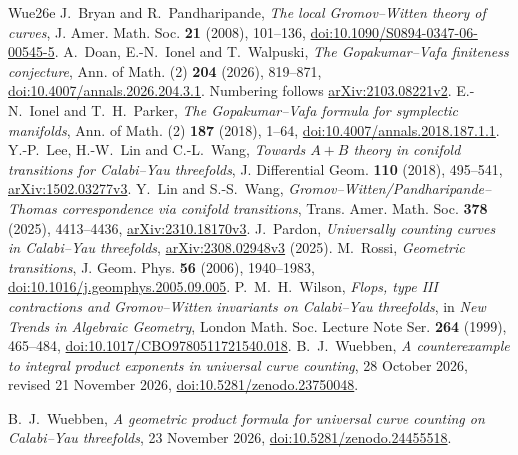 \begin{thebibliography}{Wue26e}
 J.~Bryan and R.~Pandharipande,
\emph{The local Gromov--Witten theory of curves}, J. Amer. Math. Soc.
\textbf{21} (2008), 101--136,
\href{https://doi.org/10.1090/S0894-0347-06-00545-5}{doi:10.1090/S0894-0347-06-00545-5}.
 A.~Doan, E.-N.~Ionel and T.~Walpuski,
\emph{The Gopakumar--Vafa finiteness conjecture}, Ann. of Math. (2)
\textbf{204} (2026), 819--871,
\href{https://doi.org/10.4007/annals.2026.204.3.1}{doi:10.4007/annals.2026.204.3.1}.
Numbering follows \href{https://arxiv.org/abs/2103.08221v2}{arXiv:2103.08221v2}.
 E.-N.~Ionel and T.~H.~Parker,
\emph{The Gopakumar--Vafa formula for symplectic manifolds},
Ann. of Math. (2) \textbf{187} (2018), 1--64,
\href{https://doi.org/10.4007/annals.2018.187.1.1}{doi:10.4007/annals.2018.187.1.1}.
 Y.-P.~Lee, H.-W.~Lin and C.-L.~Wang,
\emph{Towards $A+B$ theory in conifold transitions for Calabi--Yau threefolds},
J. Differential Geom. \textbf{110} (2018), 495--541,
\href{https://arxiv.org/abs/1502.03277v3}{arXiv:1502.03277v3}.
 Y.~Lin and S.-S.~Wang,
\emph{Gromov--Witten/Pandharipande--Thomas correspondence via conifold transitions},
Trans. Amer. Math. Soc. \textbf{378} (2025), 4413--4436,
\href{https://arxiv.org/abs/2310.18170v3}{arXiv:2310.18170v3}.
 J.~Pardon, \emph{Universally counting curves in
Calabi--Yau threefolds}, \href{https://arxiv.org/abs/2308.02948v3}{arXiv:2308.02948v3} (2025).
 M.~Rossi, \emph{Geometric transitions},
J. Geom. Phys. \textbf{56} (2006), 1940--1983,
\href{https://doi.org/10.1016/j.geomphys.2005.09.005}{doi:10.1016/\allowbreak j.geomphys.2005.09.005}.
 P.~M.~H.~Wilson,
\emph{Flops, type III contractions and Gromov--Witten invariants on
Calabi--Yau threefolds}, in \emph{New Trends in Algebraic Geometry},
London Math. Soc. Lecture Note Ser. \textbf{264} (1999), 465--484,
\href{https://doi.org/10.1017/CBO9780511721540.018}{doi:10.1017/CBO9780511721540.018}.
 B.~J.~Wuebben,
\emph{A counterexample to integral product exponents in universal curve counting}, 28 October 2026, revised 21 November 2026,
\href{https://doi.org/10.5281/zenodo.23750048}{doi:10.5281/zenodo.23750048}.

 B.~J.~Wuebben,
\emph{A geometric product formula for universal curve counting on Calabi--Yau threefolds}, 23 November 2026,
\href{https://doi.org/10.5281/zenodo.24455518}{doi:10.5281/zenodo.24455518}.


\end{thebibliography}
